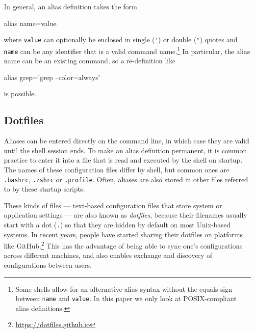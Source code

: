 

In general, an alias definition takes the form
\begin{CVerbatim}
alias name=value
\end{CVerbatim}
where \verb|value| can optionally be enclosed in single (\verb|'|) or double (\verb|"|) quotes and \verb|name| can be any identifier that is a valid command name.\footnote{Some shells allow for an alternative alias syntax without the equals sign between \texttt{name} and \texttt{value}. In this paper we only look at POSIX-compliant alias definitions.}
In particular, the alias name can be an existing command, so a re-definition like
\begin{CVerbatim}
alias grep='grep --color=always'
\end{CVerbatim}
is possible.

\subsection{Dotfiles}

Aliases can be entered directly on the command line, in which case they are valid until the shell session ends.
To make an alias definition permanent, it is common practice to enter it into a file that is read and executed by the shell on startup.
The names of these configuration files differ by shell, but common ones are \verb|.bashrc|, \verb|.zshrc| or \verb|.profile|.
Often, aliases are also stored in other files referred to by these startup scripts.

These kinds of files --- text-based configuration files that store system or application settings --- are also known as \emph{dotfiles}, because their filenames usually start with a dot (\verb|.|) so that they are hidden by default on most Unix-based systems.
In recent years, people have started sharing their dotfiles on platforms like GitHub.\footnote{\url{https://dotfiles.github.io}}
This has the advantage of being able to sync one's configurations across different machines, and also enables exchange and discovery of configurations between users.
